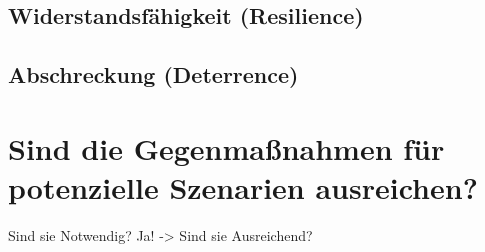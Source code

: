 \documentclass[final,bibliography=totocnumbered]{include/sikseminar}
\begin{document}
\subsection{Widerstandsfähigkeit (Resilience)}\label{subsec:widerstand} %


\subsection{Abschreckung (Deterrence)}\label{subsec:abschreckung} %

\section{Sind die Gegenmaßnahmen für potenzielle Szenarien ausreichen?}\label{sec:diskussion}

Sind sie Notwendig?
Ja! -> Sind sie Ausreichend?

\newpage
\printglossary[type=\acronymtype]
~\nocite{*}

\printbibliography
\newpage
\end{document}
